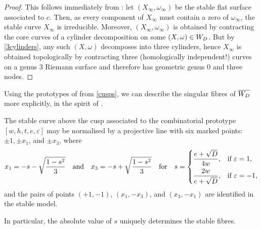 \documentclass{amsart}
\def\ep{\varepsilon}
\begin{document}
\begin{proof}
This follows immediately from \cite[Corollary 5.11]{parkcity}: let $(X_\infty,\omega_\infty)$ be the stable flat surface associated to $c$. Then, as every component of $X_\infty$ must contain a zero of $\omega_\infty$, the stable curve $X_\infty$ is irreducible. Moreover, $(X_\infty,\omega_\infty)$ is obtained by contracting the core curves of a cylinder decomposition on some $(X,\omega)\in\W$. But by \autoref{3cylinders}, any such $(X,\omega)$ decomposes into three cylinders, hence $X_\infty$ is obtained topologically by contracting three (homologically independent!) curves on a genus $3$ Riemann surface and therefore has geometric genus $0$ and three nodes. 
\end{proof}

Using the prototypes of \cite{lanneaunguyen} from \autoref{cusps}, we can describe the singular fibres of $\overline{\W}$ more explicitly, in the spirit of \cite[Proposition 3.2]{BMFuchs}.

\begin{prop}\label{stablecoordinates}
The stable curve above the cusp associated to the combinatorial prototype $[w,h,t,e,\ep]$ may %
be normalised by a projective line with six marked points: $\pm1,\pm x_1$, and $\pm x_3$, where
\[x_1=-s-\sqrt{\frac{1-s^2}{3}}\quad\text{and}\quad x_3=-s+\sqrt{\frac{1-s^2}{3}}\quad\text{for}\quad s=\begin{dcases}\frac{e+\sqrt{D}}{4w},&\text{if $\ep=1$,}\\\frac{2w}{e+\sqrt{D}},&\text{if $\ep=-1$,}\end{dcases}\]
and the pairs of points $(+1,-1)$, $(x_1,-x_3)$, and $(x_3,-x_1)$ are identified in the stable model.

In particular, %
the absolute value of $s$ uniquely determines the stable fibres.
\end{prop}
\end{document}

